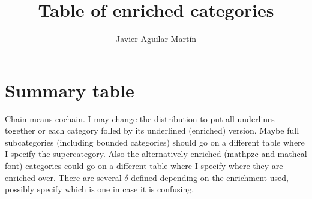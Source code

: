 \documentclass[twoside]{article}
\begin{document}
\title{Table of enriched categories}
\author{Javier Aguilar Martín}
\maketitle

\section{Summary table}
Chain means cochain. I may change the distribution to put all underlines together or each category folled by its underlined (enriched) version. Maybe full subcategories (including bounded categories) should go on a different table where I specify the supercategory. Also the alternatively enriched (mathpzc and mathcal font) categories could go on a different table where I specify where they are enriched over. There are several $\delta$ defined depending  on the enrichment used, possibly specify which is one in case it is confusing.
\end{document}
